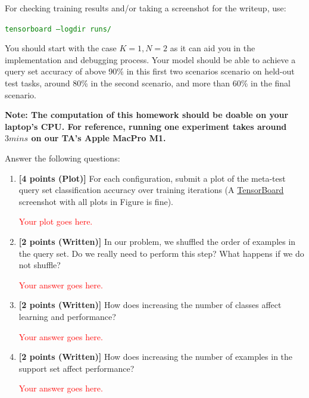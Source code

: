 \documentclass[12pt]{article}
\begin{document}
For checking training results and/or taking a screenshot for the writeup, use:

\textcolor{green}{\texttt{tensorboard --logdir runs/}}

You should start with the case $K=1 , N=2$ as it can aid you in the implementation and debugging process. Your model should be able to achieve a query set accuracy of above 90\% in this first two scenarios scenario on held-out test tasks, around 80\% in the second scenario, and more than 60\% in the final scenario.

\textbf{Note: The computation of this homework should be doable on your laptop's CPU. For reference, running one experiment takes around $3mins$ on our TA's Apple MacPro M1.} 



Answer the following questions:

\begin{enumerate}
    \item \textbf{[4 points (Plot)]} For each configuration, submit a plot of the meta-test query set classification accuracy over training iterations (A \href{https://pytorch.org/docs/stable/tensorboard.html}{TensorBoard} screenshot with all plots in Figure is fine).
    
    \textcolor{red}{Your plot goes here.}

    \item \textbf{[2 points (Written)]} In our problem, we shuffled the order of examples in the query set. Do we really need to perform this step? What happens if we do not shuffle?

    \textcolor{red}{Your answer goes here.}
    
    \item \textbf{[2 points (Written)]} How does increasing the number of classes affect learning and performance?
    
    \textcolor{red}{Your answer goes here.}
    
    \item \textbf{[2 points (Written)]} How does increasing the number of examples in the support set affect performance?
    
   \textcolor{red}{Your answer goes here.}
    
\end{enumerate}
\end{document}
